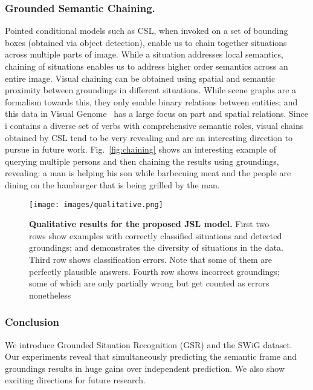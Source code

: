 \documentclass[runningheads]{llncs}
\newcommand{\dataset}{\mbox{\sc{SW}}i\mbox{\sc{G}}\xspace}
\begin{document}
\subsubsection{Grounded Semantic Chaining. }
Pointed conditional models such as CSL, when invoked on a set of bounding boxes (obtained via object detection), enable us to chain together situations across multiple parts of image. While a situation addresses local semantics, chaining of situations enables us to address higher order semantics across an entire image. Visual chaining can be obtained using spatial and semantic proximity between groundings in different situations. While scene graphs are a formalism towards this, they only enable binary relations between entities; and this data in Visual Genome~\cite{visualgenome} has a large focus on part and spatial relations. Since \dataset{} contains a diverse set of verbs with comprehensive semantic roles, visual chains obtained by CSL tend to be very revealing and are an interesting direction to pursue in future work. Fig.~\ref{fig:chaining} shows an interesting example of querying multiple persons and then chaining the results using groundings, revealing: a man is helping his son while barbecuing meat and the people are dining on the hamburger that is being grilled by the man.

\begin{figure*}[!t]
\begin{center}
\texttt{[image: images/qualitative.png]}
\end{center}
\vspace{-5mm}
\caption{\textbf{Qualitative results for the proposed JSL model.} First two rows show examples with correctly classified situations and detected groundings; and demonstrates the diversity of situations in the data. Third row shows classification errors. Note that some of them are perfectly plausible answers. Fourth row shows incorrect groundings; some of which are only partially wrong but get counted as errors nonetheless}
\label{fig:qualitative}
\vspace{-5mm}
\end{figure*} \vspace{-5mm}
\subsubsection{Conclusion}
\vspace{-5mm}

We introduce Grounded Situation Recognition (GSR) and the SWiG dataset. Our experiments reveal that simultaneously predicting the semantic frame and groundings results in huge gains over independent prediction. We also show exciting directions for future research.
\end{document}
